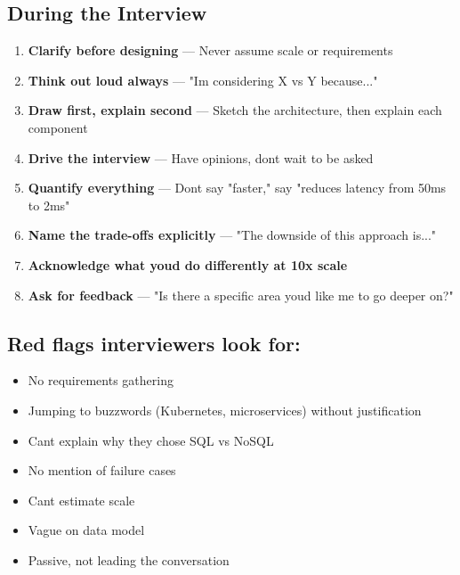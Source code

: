 \documentclass[11pt]{article}
\providecommand{\tightlist}{\setlength{\itemsep}{1pt}\setlength{\parskip}{0pt}}
\begin{document}
\subsection{During the Interview}\label{during-the-interview}

\begin{enumerate}
\def\labelenumi{\arabic{enumi}.}
\tightlist
\item
  \textbf{Clarify before designing} --- Never assume scale or requirements
\item
  \textbf{Think out loud always} --- "I\textquotesingle m considering X vs Y because..."
\item
  \textbf{Draw first, explain second} --- Sketch the architecture, then explain each component
\item
  \textbf{Drive the interview} --- Have opinions, don\textquotesingle t wait to be asked
\item
  \textbf{Quantify everything} --- Don\textquotesingle t say "faster," say "reduces latency from 50ms to 2ms"
\item
  \textbf{Name the trade-offs explicitly} --- "The downside of this approach is..."
\item
  \textbf{Acknowledge what you\textquotesingle d do differently at 10x scale}
\item
  \textbf{Ask for feedback} --- "Is there a specific area you\textquotesingle d like me to go deeper on?"
\end{enumerate}

\subsection{Red flags interviewers look for:}\label{red-flags-interviewers-look-for}

\begin{itemize}
\tightlist
\item
  No requirements gathering
\item
  Jumping to buzzwords (Kubernetes, microservices) without justification
\item
  Can\textquotesingle t explain why they chose SQL vs NoSQL
\item
  No mention of failure cases
\item
  Can\textquotesingle t estimate scale
\item
  Vague on data model
\item
  Passive, not leading the conversation
\end{itemize}
\end{document}
